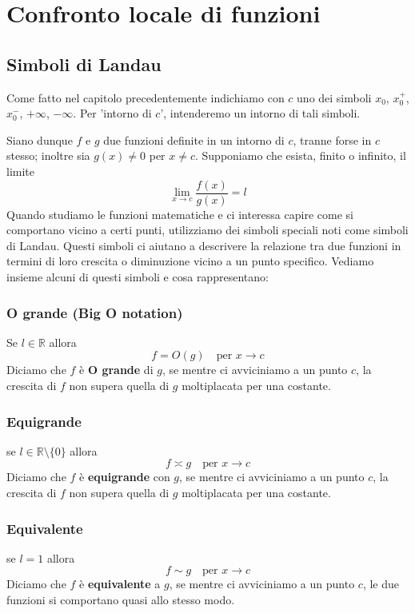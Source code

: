 \documentclass{book}
\begin{document}
\chapter{Confronto locale di funzioni}

\section{Simboli di Landau}
Come fatto nel capitolo precedentemente indichiamo con \(c\) uno dei simboli \(x_0\), \(x_0^+\), \(x_0^-\), \(+\infty\), \(-\infty\).
Per 'intorno di \(c\)', intenderemo un intorno di tali simboli.

Siano dunque \(f\) e \(g\) due funzioni definite in un intorno di \(c\), tranne forse in \(c\) stesso; inoltre sia \(g(x) \neq 0\) per \(x \neq c\).
Supponiamo che esista, finito o infinito, il limite
\[
    \lim_{x \to c} \frac{f(x)}{g(x)} = l
\]
Quando studiamo le funzioni matematiche e ci interessa capire come si comportano vicino a certi punti, utilizziamo dei simboli speciali noti come simboli di Landau. Questi simboli ci aiutano a descrivere la relazione tra due funzioni in termini di loro crescita o diminuzione vicino a un punto specifico. Vediamo insieme alcuni di questi simboli e cosa rappresentano:
\begin {definition}
\subsection{O grande (Big O notation)}
Se \(l \in \mathbb{R}\) allora
\[
    f = O(g) \quad \text{per } x \to c
\]
Diciamo che \(f\) è \textbf{O grande} di \(g\), se mentre ci avviciniamo a un punto \(c\), la crescita di \(f\) non supera quella di \(g\) moltiplacata per una costante.
\end{definition}

\begin{definition}
    \subsection{Equigrande}
    se \(l \in \mathbb{R} \setminus \{0\} \) allora
    \[
        f \asymp g \quad \text{per } x \to c
    \]
    Diciamo che \(f\) è \textbf{equigrande} con \(g\), se mentre ci avviciniamo a un punto \(c\), la crescita di \(f\) non supera quella di \(g\) moltiplacata per una costante.
\end{definition}

\begin{definition}
    \subsection{Equivalente}
    se \(l = 1\) allora
    \[
        f \sim g \quad \text{per } x \to c
    \]
    Diciamo che \(f\) è \textbf{equivalente} a \(g\), se mentre ci avviciniamo a un punto \(c\), le due funzioni si comportano quasi allo stesso modo.
\end{definition}
\end{document}
